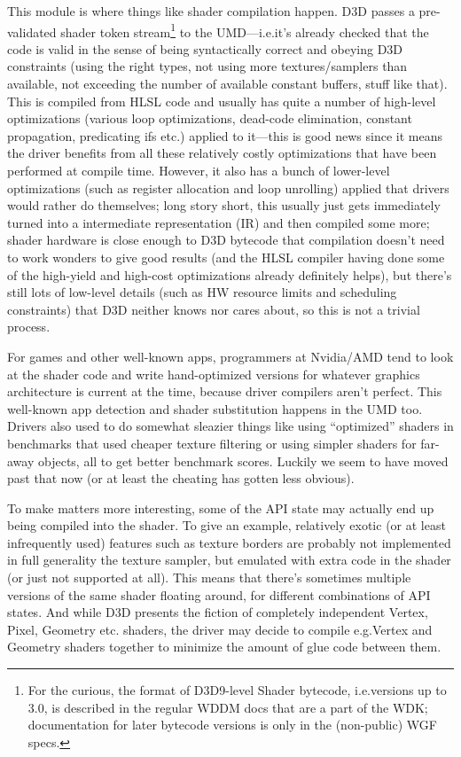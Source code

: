 This module is where things like shader compilation happen. D3D passes a
pre-validated shader token stream\footnote{For the curious, the format of 
D3D9-level Shader bytecode, i.e.\@ versions up to 3.0, is described in the 
regular WDDM docs that are a part of the WDK; documentation for later bytecode 
versions is only in the (non-public) WGF specs.} to the UMD---i.e.\@ it's 
already checked that the code is valid in the sense of being syntactically 
correct and obeying D3D constraints (using the right types, not using more 
textures/samplers than
available, not exceeding the number of available constant buffers, stuff like
that). This is compiled from HLSL code and usually has quite a number of
high-level optimizations (various loop optimizations, dead-code elimination,
constant propagation, predicating ifs etc.) applied to it---this is good news
since it means the driver benefits from all these relatively costly
optimizations that have been performed at compile time. However, it also has a
bunch of lower-level optimizations (such as register allocation and loop
unrolling) applied that drivers would rather do themselves; long story short,
this usually just gets immediately turned into a intermediate representation
(IR) and then compiled some more; shader hardware is close enough to D3D
bytecode that compilation doesn't need to work wonders to give good results
(and the HLSL compiler having done some of the high-yield and high-cost
optimizations already definitely helps), but there's still lots of low-level
details (such as HW resource limits and scheduling constraints) that D3D
neither knows nor cares about, so this is not a trivial process.

For games and other well-known apps, programmers at Nvidia/AMD tend to look at 
the shader code and write hand-optimized versions for whatever graphics 
architecture is current at the time, because driver compilers aren't perfect.  
This well-known app detection and shader substitution happens in the UMD too.  
Drivers also used to do somewhat sleazier things like using ``optimized'' 
shaders in benchmarks that used cheaper texture filtering or using simpler 
shaders for far-away objects, all to get better benchmark scores. Luckily we 
seem to have moved past that now (or at least the cheating has gotten less 
obvious).

To make matters more interesting, some of the API state may actually end up 
being compiled into the shader. To give an example, relatively exotic (or at 
least infrequently used) features such as texture borders are probably not 
implemented in full generality the texture sampler, but emulated with extra
code in the shader (or just not supported at all). This means that there's 
sometimes multiple versions of the same shader floating around, for different 
combinations of API states. And while D3D presents the fiction of completely 
independent Vertex, Pixel, Geometry etc. shaders, the driver may decide to 
compile e.g.\@ Vertex and Geometry shaders together to minimize the amount of 
glue code between them.

